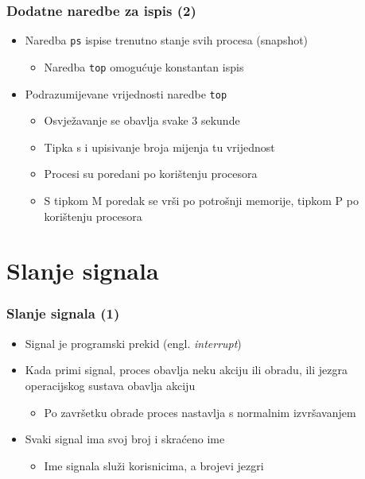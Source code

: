 \documentclass[table,usenames,dvipsnames]{beamer}
\newcommand{\shell}[1]{\texttt{#1}}
\begin{document}
\begin{frame}[t]
\frametitle{Dodatne naredbe za ispis (2)}
\begin{itemize}
  \item Naredba \shell{ps} ispise trenutno stanje svih procesa (snapshot)
  \begin{itemize}
    \item Naredba \shell{top} omogućuje konstantan ispis
  \end{itemize}
  \item Podrazumijevane vrijednosti naredbe \shell{top}
  \begin{itemize} 
    \item Osvježavanje se obavlja svake 3 sekunde
    \item Tipka s i upisivanje broja mijenja tu vrijednost
    \item Procesi su poredani po korištenju procesora
    \item S tipkom M poredak se vrši po potrošnji memorije, tipkom P po 
          korištenju procesora
  \end{itemize}
\end{itemize}
\end{frame}

\section{Slanje signala}
\begin{frame}[t]
\frametitle{Slanje signala (1)}
\begin{itemize}
  \item Signal je programski prekid (engl. \emph{interrupt})
  \item Kada primi signal, proces obavlja neku akciju ili obradu, ili jezgra 
        operacijskog sustava obavlja akciju
  \begin{itemize}
    \item Po završetku obrade proces nastavlja s normalnim izvršavanjem
  \end{itemize}
  \item Svaki signal ima svoj broj i skraćeno ime
  \begin{itemize}
    \item  Ime signala služi korisnicima, a brojevi jezgri
  \end{itemize}
\end{itemize}
\end{frame}
\end{document}
